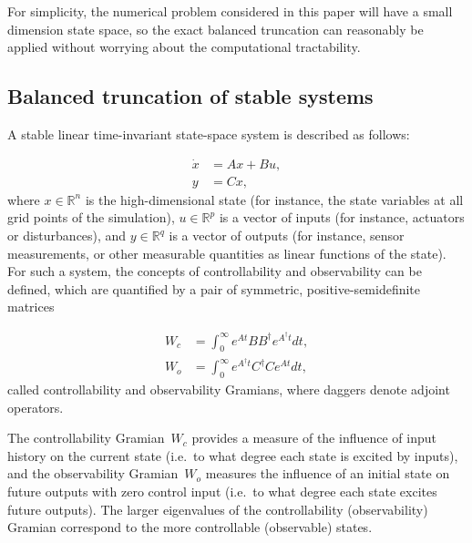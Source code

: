 \documentclass[12pt,lot, lof]{puthesis}
\begin{document}
For simplicity, the numerical problem considered in this paper will have a small dimension state space, so the exact balanced truncation can reasonably be applied without worrying about the computational tractability.



\subsection{Balanced truncation of stable systems}
\label{BT}
A stable linear time-invariant state-space system is described as follows: 

\begin{equation}
\label{linSS}
\begin{aligned}
	\dot{x}&= A x  + B u,   \\
	y &= C x ,
\end{aligned}
\end{equation}
where $x \in \mathbb{R}^n$ is the high-dimensional state (for instance, the state variables at all  grid points of the simulation), $u \in \mathbb{R}^p$ is a vector of inputs (for instance, actuators or disturbances), and $y \in \mathbb{R}^q$ is a vector of outputs (for instance, sensor measurements, or other measurable quantities as linear functions of the state).\\

For such a system, the concepts of controllability and observability can be defined, which are quantified by a pair of symmetric, positive-semidefinite matrices

\begin{subequations}
\begin{align}
W_c  &= \int_0 ^{\infty} e^{At} B B^{\dagger}  e^{A^{\dagger}t} dt, \\
W_o  &= \int_0 ^{\infty} e^{A^\dagger t}  C^\dagger C  e^{At} dt, 
\end{align}
\end{subequations}
called controllability and observability Gramians, where daggers denote adjoint operators.

 The controllability Gramian~$W_c$ provides a measure of the influence of input history on the current state (i.e.\ to what degree each state is excited by inputs), and the observability  Gramian~$W_o$ measures the influence of an initial state on future outputs with zero control input (i.e.\ to what degree each state excites future outputs). The larger eigenvalues of the controllability (observability) Gramian correspond to the more controllable (observable) states.
\end{document}
